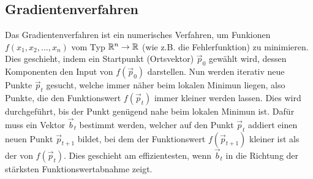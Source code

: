 \begin{appendices}

\chapter{Gradientenverfahren}\label{sec:anhang_gd}
Das Gradientenverfahren ist ein numerisches Verfahren, um Funkionen $f(x_1,
x_2, \ldots, x_n)$ vom Typ $\mathbb{R}^n \to \mathbb{R}$ (wie z.B. die Fehlerfunktion)
zu minimieren.
Dies geschieht, indem ein Startpunkt (Ortsvektor) $\vec{p}_0$ gewählt wird, dessen
Komponenten den Input von $f(\vec{p}_0)$ darstellen.
Nun werden iterativ neue Punkte $\vec{p}_t$ gesucht, welche immer näher beim lokalen Minimun liegen, also Punkte, die den Funktionswert $f(\vec{p}_t)$ immer kleiner werden lassen.
Dies wird durchgeführt, bis der Punkt genügend nahe beim lokalen Minimun ist.
\para{}
Dafür muss ein Vektor $\vec{b}_t$ bestimmt werden, welcher auf den Punkt $\vec{p}_t$ addiert einen neuen Punkt $\vec{p}_{t+1}$ bildet,
bei dem der Funktionswert $f(\vec{p}_{t+1})$ kleiner ist als der von $f(\vec{p}_t)$.
Dies geschieht am effizientesten, wenn $\vec{b}_t$ in die Richtung der stärksten Funktionswertabnahme zeigt.


\end{appendices}
